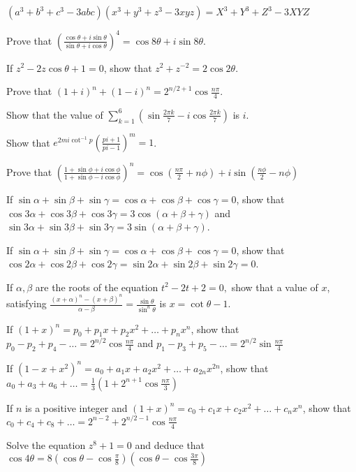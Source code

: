   \item $(a^3 + b^3 + c^3 - 3abc)(x^3 + y^3 + z^3 - 3xyz) = X^3 + Y^3 + Z^3 - 3XYZ$
  \stopitemize
\item Prove that $\left(\frac{\cos\theta + i\sin\theta}{\sin\theta + i\cos\theta}\right)^4 = \cos8\theta + i\sin8\theta$.
\item If $z^2 - 2z\cos\theta + 1 = 0$, show that $z^2 + z^{-2} = 2\cos2\theta$.
\item Prove that $(1 + i)^n + (1 - i)^n = 2^{n/2 + 1}\cos\frac{n\pi}{4}$.
\item Show that the value of $\sum_{k = 1}^6\left(\sin\frac{2\pi k}{7} - i\cos\frac{2\pi k}{7}\right)$ is $i$.
\item Show that $e^{2mi\cot^{-1}p}\left(\frac{pi + 1}{pi - 1}\right)^m = 1$.
\item Prove that $\left(\frac{1 + \sin\phi + i\cos\phi}{1 + \sin\phi - i\cos\phi}\right)^n = \cos\left(\frac{n\pi}{2} +
  n\phi\right) + i\sin\left(\frac{n\phi}{2} - n\phi\right)$
\item If $\sin\alpha + \sin\beta + \sin\gamma = \cos\alpha + \cos\beta + \cos\gamma = 0$, show that $\cos3\alpha + \cos3\beta +
  \cos3\gamma = 3\cos(\alpha + \beta + \gamma)$ and $\sin3\alpha + \sin3\beta + \sin3\gamma = 3\sin(\alpha + \beta + \gamma)$.
\item If $\sin\alpha + \sin\beta + \sin\gamma = \cos\alpha + \cos\beta + \cos\gamma = 0$, show that $\cos2\alpha + \cos2\beta +
  \cos2\gamma = \sin2\alpha + \sin2\beta + \sin2\gamma = 0$.
\item If $\alpha, \beta$ are the roots of the equation $t^2 - 2t + 2 = 0,$ show that a value of $x$, satisfying $\frac{(x +
  \alpha)^n - (x + \beta)^n}{\alpha - \beta} = \frac{\sin\theta}{\sin^n\theta}$ is $x = \cot\theta - 1$.
\item If $(1 + x)^n = p_0 + p_1x + p_2x^2 + \ldots + p_nx^n$, show that $p_0 - p_2 + p_4 - \ldots = 2^{n/2}\cos\frac{n\pi}{4}$ and
  $p_1 - p_3 + p_5 - \ldots = 2^{n/2}\sin\frac{n\pi}{4}$
\item If $(1 - x + x^2)^n = a_0 + a_1x + a_2x^2 + \ldots + a_{2n}x^{2n}$, show that $a_0 + a_3 + a_6 + \ldots = \frac{1}{3}\left(1
  + 2^{n + 1}\cos\frac{n\pi}{3}\right)$
\item If $n$ is a positive integer and $(1 + x)^n = c_0 + c_1x + c_2x^2 + \ldots + c_nx^n$, show that $c_0 + c_4 + c_8 + \ldots =
  2^{n - 2} + 2^{n/2 - 1}\cos\frac{n\pi}{4}$
\item Solve the equation $z^8 + 1= 0$ and deduce that $\cos4\theta = 8\left(\cos\theta - \cos\frac{\pi}{8}\right)\left(\cos\theta -
  \cos\frac{3\pi}{8}\right)$

